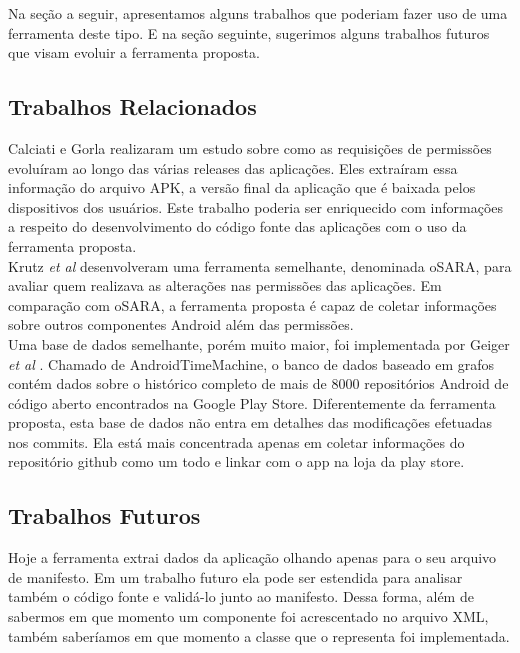 \documentclass[a4paper,12pt]{article}
\begin{document}
{Na seção a seguir, apresentamos alguns trabalhos que poderiam fazer uso de uma ferramenta deste tipo. E na seção seguinte, sugerimos alguns trabalhos futuros que visam evoluir a ferramenta proposta.


\subsection{Trabalhos Relacionados}%

Calciati e Gorla \cite{Calciati} realizaram um estudo sobre como as requisições de permissões evoluíram ao longo das várias releases das aplicações. Eles extraíram essa informação do arquivo APK, a versão final da aplicação que é baixada pelos dispositivos dos usuários. Este trabalho poderia ser enriquecido com informações a respeito do desenvolvimento do código fonte das aplicações com o uso da ferramenta proposta. \\

Krutz \textit{et al} \cite{WhoAdded} desenvolveram uma ferramenta semelhante, denominada oSARA, para avaliar quem realizava as alterações nas permissões das aplicações. Em comparação com oSARA, a ferramenta proposta é capaz de coletar informações sobre outros componentes Android além das permissões.\\

Uma base de dados semelhante, porém muito maior, foi implementada por Geiger \textit{et al} \cite{graphDB}. Chamado de AndroidTimeMachine, o banco de dados baseado em grafos contém dados sobre o histórico completo de mais de 8000 repositórios Android de código aberto encontrados na Google Play Store. Diferentemente da ferramenta proposta, esta base de dados não entra em detalhes das modificações efetuadas nos commits. Ela está mais concentrada apenas em coletar informações do repositório github como um todo e linkar com o app na loja da play store.


\subsection{Trabalhos Futuros}



Hoje a ferramenta extrai dados da aplicação olhando apenas para o seu arquivo de manifesto. Em um trabalho futuro ela pode ser estendida para analisar também o código fonte e validá-lo junto ao manifesto. Dessa forma, além de sabermos em que momento um componente foi acrescentado no arquivo XML, também saberíamos em que momento a classe que o representa foi implementada.

}
\end{document}

